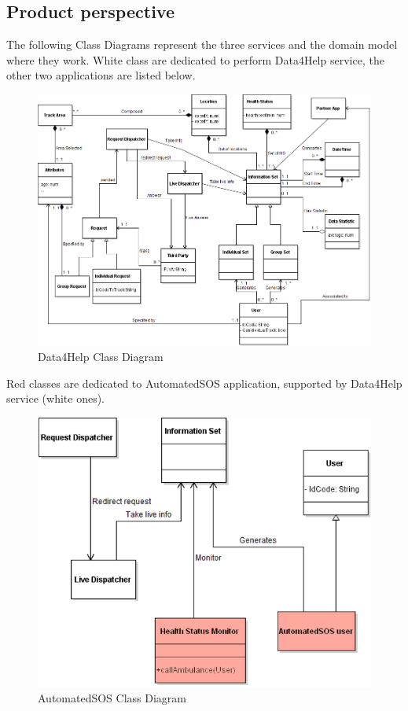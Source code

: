 \subsection{Product perspective}
The following Class Diagrams represent the three services and the domain model where they work.
White class are dedicated to perform Data4Help service, the other two applications are listed below.
\begin{figure}[H]
\centering
\includegraphics[scale=0.45]{Images/Class_Data4Help.png}
\caption{Data4Help Class Diagram}
\end{figure}
\noindent
{\color{Salmon} Red classes} are dedicated to {\color{Salmon} AutomatedSOS} application, supported by Data4Help service (white ones).
\begin{figure}[H]
\centering
\includegraphics[scale=0.48]{Images/Class_AutoSOS.png}
\caption{AutomatedSOS Class Diagram}
\end{figure}

